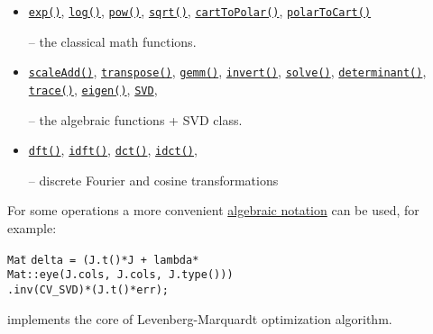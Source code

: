 \documentclass[10pt,landscape]{article}
\begin{document}
\begin{multicols}{3}
\begin{itemize}
\item
\texttt{\href{http://opencv.itseez.com/modules/core/doc/operations_on_arrays.html\#exp}{exp()}},
\texttt{\href{http://opencv.itseez.com/modules/core/doc/operations_on_arrays.html\#log}{log()}},
\texttt{\href{http://opencv.itseez.com/modules/core/doc/operations_on_arrays.html\#pow}{pow()}},
\texttt{\href{http://opencv.itseez.com/modules/core/doc/operations_on_arrays.html\#sqrt}{sqrt()}},
\texttt{\href{http://opencv.itseez.com/modules/core/doc/operations_on_arrays.html\#carttopolar}{cartToPolar()}},
\texttt{\href{http://opencv.itseez.com/modules/core/doc/operations_on_arrays.html\#polartocart}{polarToCart()}}

-- the classical math functions.

\item
\texttt{\href{http://opencv.itseez.com/modules/core/doc/operations_on_arrays.html\#scaleadd}{scaleAdd()}},
\texttt{\href{http://opencv.itseez.com/modules/core/doc/operations_on_arrays.html\#transpose}{transpose()}},
\texttt{\href{http://opencv.itseez.com/modules/core/doc/operations_on_arrays.html\#gemm}{gemm()}},
\texttt{\href{http://opencv.itseez.com/modules/core/doc/operations_on_arrays.html\#invert}{invert()}},
\texttt{\href{http://opencv.itseez.com/modules/core/doc/operations_on_arrays.html\#solve}{solve()}},
\texttt{\href{http://opencv.itseez.com/modules/core/doc/operations_on_arrays.html\#determinant}{determinant()}},
\texttt{\href{http://opencv.itseez.com/modules/core/doc/operations_on_arrays.html\#trace}{trace()}},
\texttt{\href{http://opencv.itseez.com/modules/core/doc/operations_on_arrays.html\#eigen}{eigen()}},
\texttt{\href{http://opencv.itseez.com/modules/core/doc/operations_on_arrays.html\#SVD}{SVD}},

-- the algebraic functions + SVD class.

\item
\texttt{\href{http://opencv.itseez.com/modules/core/doc/operations_on_arrays.html\#dft}{dft()}},
\texttt{\href{http://opencv.itseez.com/modules/core/doc/operations_on_arrays.html\#idft}{idft()}},
\texttt{\href{http://opencv.itseez.com/modules/core/doc/operations_on_arrays.html\#dct}{dct()}},
\texttt{\href{http://opencv.itseez.com/modules/core/doc/operations_on_arrays.html\#idct}{idct()}},

-- discrete Fourier and cosine transformations 

\end{itemize}

For some operations a more convenient \href{http://opencv.itseez.com/modules/core/doc/basic_structures.html\#matrix-expressions}{algebraic notation} can be used, for example:
\begin{tabbing}
\texttt{Mat}\={} \texttt{delta = (J.t()*J + lambda*}\\
\>\texttt{Mat::eye(J.cols, J.cols, J.type()))}\\
\>\texttt{.inv(CV\_SVD)*(J.t()*err);}
\end{tabbing}
implements the core of Levenberg-Marquardt optimization algorithm.


\end{multicols}
\end{document}
